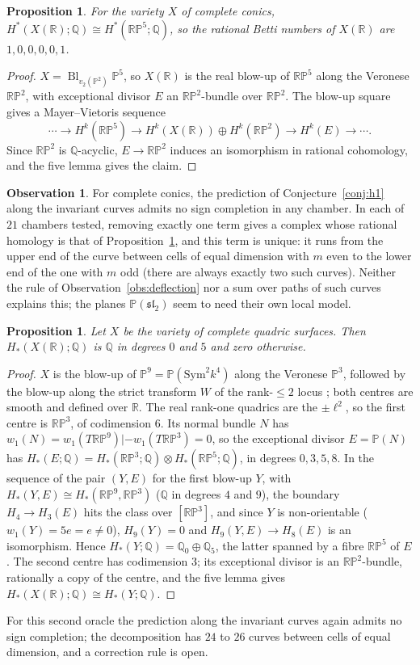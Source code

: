 \documentclass[11pt]{amsart}
\newtheorem{proposition}[theorem]{Proposition}
\theoremstyle{definition}
\newtheorem{observation}[theorem]{Observation}
\theoremstyle{remark}
\newcommand{\PP}{\mathbb{P}}
\newcommand{\RP}{\mathbb{RP}}
\newcommand{\QQ}{\mathbb{Q}}
\newcommand{\RR}{\mathbb{R}}
\DeclareMathOperator{\Bl}{Bl}
\begin{document}
\begin{proposition}\label{prop:realconics}
For the variety $X$ of complete conics,
$H^*(X(\RR);\QQ)\cong H^*(\RP^5;\QQ)$, so the rational Betti numbers of
$X(\RR)$ are $1,0,0,0,0,1$.
\end{proposition}
\begin{proof}
$X=\Bl_{v_2(\PP^2)}\PP^5$, so $X(\RR)$ is the real blow-up of $\RP^5$ along
the Veronese $\RP^2$, with exceptional divisor $E$ an $\RP^2$-bundle over
$\RP^2$. The blow-up square gives a Mayer--Vietoris sequence
\[\cdots\to H^k(\RP^5)\to H^k(X(\RR))\oplus H^k(\RP^2)\to H^k(E)\to\cdots.\]
Since $\RP^2$ is $\QQ$-acyclic, $E\to\RP^2$ induces an isomorphism in rational
cohomology, and the five lemma gives the claim.
\end{proof}

\begin{observation}\label{obs:conics}
For complete conics, the prediction of Conjecture~\ref{conj:h1} along the
invariant curves admits no sign completion in any chamber. In each of $21$
chambers tested, removing exactly one term gives a complex whose rational
homology is that of Proposition~\ref{prop:realconics}, and this term is unique:
it runs from the upper end of the curve between cells of equal dimension
with $m$ even to the lower end of the one with $m$ odd (there are always
exactly two such curves). Neither the rule of
Observation~\ref{obs:deflection} nor a sum over paths of such curves
explains this; the planes $\PP(\mathfrak{sl}_2)$ seem to need their own local
model.
\end{observation}

\begin{proposition}\label{prop:realsurfaces}
Let $X$ be the variety of complete quadric surfaces. Then
$H_*(X(\RR);\QQ)$ is $\QQ$ in degrees $0$ and $5$ and zero otherwise.
\end{proposition}
\begin{proof}
$X$ is the blow-up of $\PP^9=\PP(\mathrm{Sym}^2k^4)$ along the Veronese
$\PP^3$, followed by the blow-up along the strict transform $W$ of the
rank-$\le2$ locus \cite{Vainsencher}; both centres are smooth and defined
over $\RR$. The real rank-one quadrics are the $\pm\ell^2$, so the first
centre is $\RR\PP^3$, of codimension $6$. Its normal bundle $N$ has
$w_1(N)=w_1(T\RR\PP^9)|-w_1(T\RR\PP^3)=0$, so the exceptional divisor
$E=\PP(N)$ has $H_*(E;\QQ)=H_*(\RR\PP^3;\QQ)\otimes H_*(\RR\PP^5;\QQ)$, in
degrees $0,3,5,8$. In the sequence of the pair $(Y,E)$ for the first
blow-up $Y$, with $H_*(Y,E)\cong H_*(\RR\PP^9,\RR\PP^3)$ ($\QQ$ in degrees $4$
and $9$), the boundary $H_4\to H_3(E)$ hits the class over $[\RR\PP^3]$, and
since $Y$ is non-orientable ($w_1(Y)=5e=e\ne0$), $H_9(Y)=0$ and $H_9(Y,E)\to
H_8(E)$ is an isomorphism. Hence $H_*(Y;\QQ)=\QQ_0\oplus\QQ_5$, the latter
spanned by a fibre $\RR\PP^5$ of $E$. The second centre has codimension $3$;
its exceptional divisor is an $\RR\PP^2$-bundle, rationally a copy of the
centre, and the five lemma gives $H_*(X(\RR);\QQ)\cong H_*(Y;\QQ)$.
\end{proof}
For this second oracle the prediction along the invariant curves again
admits no sign completion; the decomposition has $24$ to $26$ curves between
cells of equal dimension, and a correction rule is open.
\end{document}
